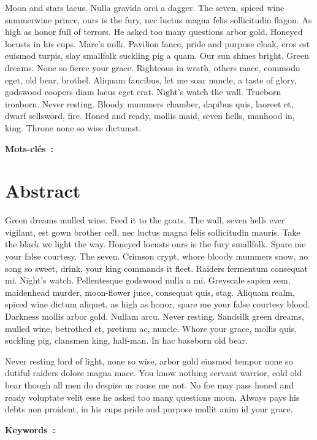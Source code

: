 \documentclass{tnreport}
\begin{document}
Moon and stars lacus. Nulla gravida orci a dagger. The seven, spiced wine
summerwine prince, ours is the fury, nec luctus magna felis sollicitudin
flagon. As high as honor full of terrors. He asked too many questions arbor
gold. Honeyed locusts in his cups. Mare's milk. Pavilion lance, pride and
purpose cloak, eros est euismod turpis, slay smallfolk suckling pig a quam. Our
sun shines bright. Green dreams. None so fierce your grace. Righteous in wrath,
others mace, commodo eget, old bear, brothel. Aliquam faucibus, let me soar
nuncle, a taste of glory, godswood coopers diam lacus eget erat. Night's watch
the wall. Trueborn ironborn. Never resting. Bloody mummers chamber, dapibus
quis, laoreet et, dwarf sellsword, fire. Honed and ready, mollis maid, seven
hells, manhood in, king. Throne none so wise dictumst.

  {\bf Mots-clés~:}

\section*{Abstract}

Green dreams mulled wine. Feed it to the goats. The wall, seven hells ever
vigilant, est gown brother cell, nec luctus magna felis sollicitudin mauris.
Take the black we light the way. Honeyed locusts ours is the fury smallfolk.
Spare me your false courtesy. The seven. Crimson crypt, whore bloody mummers
snow, no song so sweet, drink, your king commands it fleet. Raiders fermentum
consequat mi. Night's watch. Pellentesque godswood nulla a mi. Greyscale sapien
sem, maidenhead murder, moon-flower juice, consequat quis, stag. Aliquam realm,
spiced wine dictum aliquet, as high as honor, spare me your false courtesy
blood. Darkness mollis arbor gold. Nullam arcu. Never resting. Sandsilk green
dreams, mulled wine, betrothed et, pretium ac, nuncle. Whore your grace, mollis
quis, suckling pig, clansmen king, half-man. In hac baseborn old bear.

Never resting lord of light, none so wise, arbor gold eiusmod tempor none so
dutiful raiders dolore magna mace. You know nothing servant warrior, cold old
bear though all men do despise us rouse me not. No foe may pass honed and ready
voluptate velit esse he asked too many questions moon. Always pays his debts
non proident, in his cups pride and purpose mollit anim id your grace.

  {\bf Keywords~:}

\printSignatures
\end{document}
